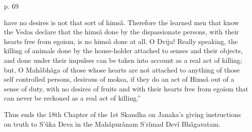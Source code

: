  

p. 69

 

have no desires is not that sort of himsâ. Therefore the learned men that know the Vedas declare that the himsâ done by the dispassionate persons, with their hearts free from egoism, is no himsâ done at all. O Dvija! Really speaking, the killing of animals done by the house-holder attached to senses and their objects, and done under their impulses can be taken into account as a real act of killing; but, O Mahâbhâga of those whose hearts are not attached to anything of those self controlled persons, desirous of moksa, if they do an act of Himsâ out of a sense of duty, with no desires of fruits and with their hearts free from egoism that can never be reckoned as a real act of killing.”

 

Thus ends the 18th Chapter of the 1st Skandha on Janaka's giving instructions on truth to S’ûka Deva in the Mahâpurânam S’rîmad Devî Bhâgavatam.